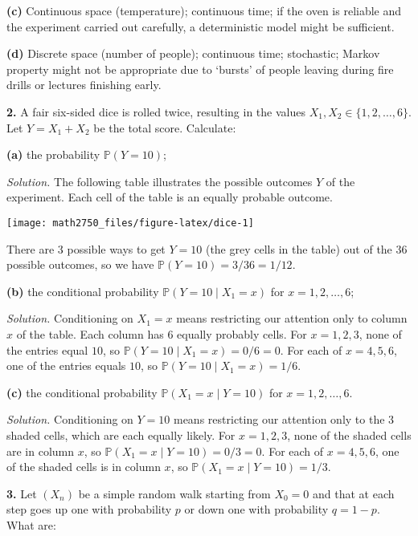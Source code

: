 \documentclass[
  a4paper,
]{article}
\theoremstyle{definition}
\theoremstyle{definition}
\theoremstyle{definition}
\theoremstyle{remark}
\begin{document}
\textbf{(c)} Continuous space (temperature); continuous time; if the oven is reliable and the experiment carried out carefully, a deterministic model might be sufficient.

\textbf{(d)} Discrete space (number of people); continuous time; stochastic; Markov property might not be appropriate due to `bursts' of people leaving during fire drills or lectures finishing early.

\textbf{2.} A fair six-sided dice is rolled twice, resulting in the
values \(X_1, X_2 \in \{1, 2, \ldots, 6\}\). Let \(Y = X_1 + X_2\) be the total score.
Calculate:

\textbf{(a)} the probability \(\mathbb P(Y = 10)\);

\emph{Solution.} The following table illustrates the possible outcomes \(Y\) of the experiment. Each cell of the table is an equally probable outcome.

\begin{center}\texttt{[image: math2750\_files/figure-latex/dice-1]} \end{center}

There are 3 possible ways to get \(Y=10\) (the grey cells in the table) out of the \(36\) possible outcomes, so we have \(\mathbb P(Y = 10) = 3/36 = 1/12\).

\textbf{(b)} the conditional probability \(\mathbb P(Y=10 \mid X_1=x)\) for \(x=1, 2, \ldots, 6\);

\emph{Solution.} Conditioning on \(X_1 = x\) means restricting our attention only to column \(x\) of the table. Each column has \(6\) equally probably cells. For \(x=1,2,3\), none of the entries equal \(10\), so \(\mathbb P(Y=10 \mid X_1=x) = 0/6 = 0\). For each of \(x=4,5,6\), one of the entries equals \(10\), so \(\mathbb P(Y=10 \mid X_1=x) = 1/6\).

\textbf{(c)} the conditional probability \(\mathbb P(X_1=x \mid Y=10)\) for \(x=1, 2, \ldots, 6\).

\emph{Solution.} Conditioning on \(Y =10\) means restricting our attention only to the \(3\) shaded cells, which are each equally likely. For \(x=1,2,3\), none of the shaded cells are in column \(x\), so \(\mathbb P(X_1=x \mid Y=10) = 0/3 = 0\). For each of \(x=4,5,6\), one of the shaded cells is in column \(x\), so \(\mathbb P(X_1=x \mid Y=10) = 1/3\).

\textbf{3.} Let \((X_n)\) be a simple random walk starting from \(X_0 = 0\) and that at each step goes up one with probability \(p\) or down one with probability \(q = 1-p\). What are:
\end{document}
